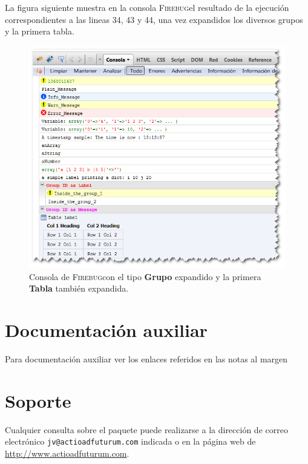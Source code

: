 \documentclass{tufte-handout}
\makeatletter
\newcommand{\Firebug}{\textsc{Firebug}}%
\newcommand{\jvaemail}{jv@actioadfuturum.com}
\makeatother
\begin{document}
La figura siguiente muestra en la consola \Firebug el resultado de la ejecución correspondientes a las lineas 34, 43 y 44, una vez expandidos los diversos grupos y la primera tabla.

\begin{figure}
\includegraphics{fb-03-ok-ok.png}%
  \caption{Consola de \Firebug con el tipo \textbf{Grupo} expandido y la primera \textbf{Tabla} también expandida.}%
  \label{fig:ff-consola-detalle}%
\end{figure}

\section{Documentación auxiliar}
Para documentación auxiliar ver los enlaces referidos en las notas al margen

\section{Soporte}\label{sec:support}
Cualquier consulta sobre el paquete puede realizarse a la dirección de correo electrónico 
\texttt{\jvaemail} indicada o en la página web de \url{http://www.actioadfuturum.com}.

%
%
\end{document}

